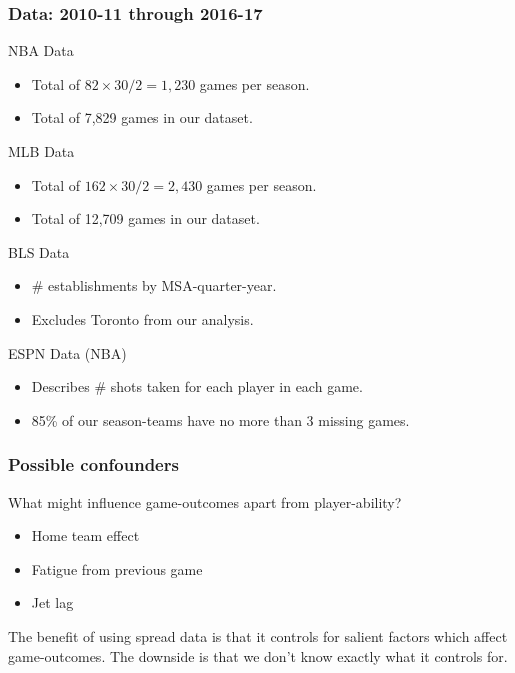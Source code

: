 \documentclass{beamer}
\begin{document}
\begin{frame}   \frametitle{Data: 2010-11 through 2016-17}
  \begin{block}{NBA Data}     \begin{itemize}       \item Total of $82 \times 30 / 2 = 1,230$ games per season.
      \item Total of 7,829 games in our dataset.     \end{itemize}
  \end{block} 
  \begin{block}{MLB Data}     \begin{itemize}       \item Total of $162 \times 30 / 2 = 2,430$ games per season.
      \item Total of 12,709 games in our dataset.     \end{itemize}   \end{block}
  \begin{block}{BLS Data}
    \begin{itemize}       \item \# establishments by MSA-quarter-year.
      \item Excludes Toronto from our analysis.     \end{itemize}   \end{block}
  \begin{block}{ESPN Data (NBA)}     \begin{itemize}       \item Describes \# shots taken for each player in each game.
      \item 85\% of our season-teams have no more than 3 missing games.     \end{itemize}   \end{block} \end{frame}

\begin{frame}
  \frametitle{Possible confounders}
  What might influence game-outcomes apart from player-ability?

  \vspace{12pt}\begin{itemize}     
    \item Home team effect
    \item Fatigue from previous game
    \item Jet lag   
    \end{itemize}

  \vspace{12pt}The benefit of using spread data is that it controls for salient factors which affect game-outcomes.
  The downside is that we don't know exactly what it controls for. \end{frame}
\end{document}
